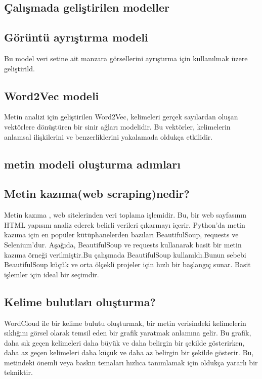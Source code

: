 \documentclass[12pt, a4paper]{article}
\begin{document}
	\subsection{Çalışmada geliştirilen modeller}
	\subsection{Görüntü ayrıştırma modeli}
	Bu model veri setine ait  manzara görsellerini ayrıştırma için kullanılmak üzere geliştirild.
	
	\subsection{Word2Vec modeli}
		Metin analizi için geliştirilen Word2Vec, kelimeleri gerçek sayılardan oluşan vektörlere dönüştüren bir sinir ağları modelidir. Bu vektörler, kelimelerin anlamsal ilişkilerini ve benzerliklerini yakalamada oldukça etkilidir.	
	
	\subsection{metin modeli oluşturma adımları}
	\subsection{Metin kazıma(web scraping)nedir?}
	Metin kazıma , web sitelerinden veri toplama işlemidir. Bu, bir web sayfasının HTML yapısını analiz ederek belirli verileri çıkarmayı içerir. Python'da metin kazıma için en popüler kütüphanelerden bazıları BeautifulSoup, requests ve Selenium'dur. Aşağıda, BeautifulSoup ve requests kullanarak basit bir metin kazıma örneği verilmiştir.Bu çalışmada BeautifulSoup kullanıldı.Bunun sebebi BeautifulSoup küçük ve orta ölçekli projeler için hızlı bir başlangıç sunar. Basit işlemler için ideal bir seçimdir.
	
	\subsection{Kelime bulutları oluşturma?}
	WordCloud ile bir kelime bulutu oluşturmak, bir metin verisindeki kelimelerin sıklığını görsel olarak temsil eden bir grafik yaratmak anlamına gelir. Bu grafik, daha sık geçen kelimeleri daha büyük ve daha belirgin bir şekilde gösterirken, daha az geçen kelimeleri daha küçük ve daha az belirgin bir şekilde gösterir. Bu, metindeki önemli veya baskın temaları hızlıca tanımlamak için oldukça yararlı bir tekniktir.\\
	
\end{document}

